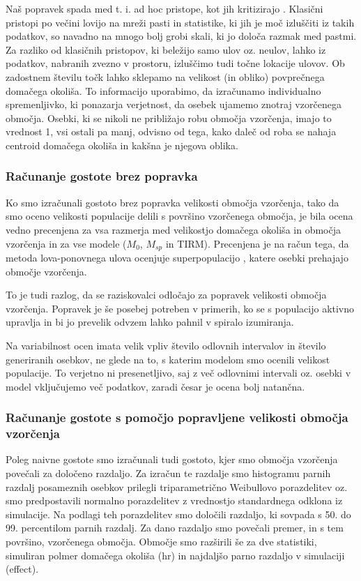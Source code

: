 Naš popravek spada med t. i. ad hoc pristope, kot jih kritizirajo \citet{royle_spatial_2013}. Klasični pristopi po večini lovijo na mreži pasti in statistike, ki jih je moč izluščiti iz takih podatkov, so navadno na mnogo bolj grobi skali, ki jo določa razmak med pastmi. Za razliko od klasičnih pristopov, ki beležijo samo ulov oz. neulov, lahko iz podatkov, nabranih zvezno v prostoru, izluščimo tudi točne lokacije ulovov. Ob zadostnem številu točk lahko sklepamo na velikost (in obliko) povprečnega domačega okoliša. To informacijo uporabimo, da izračunamo individualno spremenljivko, ki ponazarja verjetnost, da osebek ujamemo znotraj vzorčenega območja. Osebki, ki se nikoli ne približajo robu območja vzorčenja, imajo to vrednost 1, vsi ostali pa manj, odvisno od tega, kako daleč od roba se nahaja centroid domačega okoliša in kakšna je njegova oblika.

\subsubsection[\bfseries Računanje gostote brez popravka]{Računanje gostote brez popravka}
Ko smo izračunali gostoto brez popravka velikosti območja vzorčenja, tako da smo oceno velikosti populacije delili s površino vzorčenega območja, je bila ocena vedno precenjena za vsa razmerja med velikostjo domačega okoliša in območja vzorčenja in za vse modele ($M_0$, $M_{sp}$ in TIRM). Precenjena je na račun tega, da metoda lova-ponovnega ulova ocenjuje superpopulacijo \citep{white_capture-recapture_1982}, katere osebki prehajajo območje vzorčenja.

To je tudi razlog, da se raziskovalci odločajo za popravek velikosti območja vzorčenja. Popravek je še posebej potreben v primerih, ko se s populacijo aktivno upravlja in bi jo prevelik odvzem lahko pahnil v spiralo izumiranja.

Na variabilnost ocen imata velik vpliv število odlovnih intervalov in število generiranih osebkov, ne glede na to, s katerim modelom smo ocenili velikost populacije. To verjetno ni presenetljivo, saj z več odlovnimi intervali oz. osebki v model vključujemo več podatkov, zaradi česar je ocena bolj natančna.

\subsubsection[\bfseries Računanje gostote s pomočjo popravljene velikosti območja vzorčenja]{Računanje gostote s pomočjo popravljene velikosti območja vzorčenja}
Poleg naivne gostote smo izračunali tudi gostoto, kjer smo območja vzorčenja povečali za določeno razdaljo. Za izračun te razdalje smo histogramu parnih razdalj posameznih osebkov prilegli triparametrično Weibullovo porazdelitev oz. smo predpostavili normalno porazdelitev z vrednostjo standardnega odklona iz simulacije. Na podlagi teh porazdelitev smo določili razdaljo, ki sovpada s 50. do 99. percentilom parnih razdalj. Za dano razdaljo smo povečali premer, in s tem površino, vzorčenega območja. Območje smo razširili še za dve statistiki, simuliran polmer domačega okoliša (hr) in najdaljšo parno razdaljo v simulaciji (effect).

